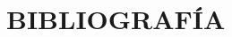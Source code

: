 \chapter*{BIBLIOGRAFÍA}
\nocite{cuevas2023}
\nocite{ley_avelino2010}
\printbibliography[heading = none]
